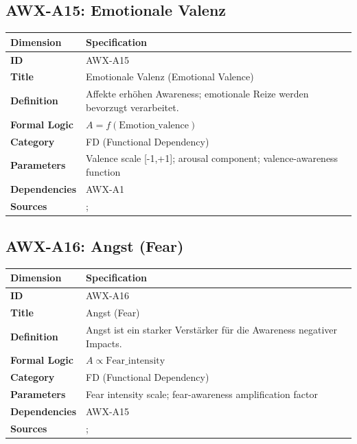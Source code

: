 
\subsection{AWX-A15: Emotionale Valenz}

\begin{table}[htbp]
\small
\begin{tabular}{p{3cm}p{11cm}}
\toprule
\textbf{Dimension} & \textbf{Specification} \\
\midrule
\textbf{ID} & AWX-A15 \\
\textbf{Title} & Emotionale Valenz (Emotional Valence) \\
\textbf{Definition} & Affekte erhöhen Awareness; emotionale Reize werden bevorzugt verarbeitet. \\
\textbf{Formal Logic} & $A = f(\text{Emotion\_valence})$ \\
\textbf{Category} & FD (Functional Dependency) \\
\textbf{Parameters} & Valence scale [-1,+1]; arousal component; valence-awareness function \\
\textbf{Dependencies} & AWX-A1 \\
\textbf{Sources} & \citet{loewenstein2001risk}; \citet{slovic2004risk} \\
\bottomrule
\end{tabular}
\end{table}


\subsection{AWX-A16: Angst (Fear)}

\begin{table}[htbp]
\small
\begin{tabular}{p{3cm}p{11cm}}
\toprule
\textbf{Dimension} & \textbf{Specification} \\
\midrule
\textbf{ID} & AWX-A16 \\
\textbf{Title} & Angst (Fear) \\
\textbf{Definition} & Angst ist ein starker Verstärker für die Awareness negativer Impacts. \\
\textbf{Formal Logic} & $A \propto \text{Fear\_intensity}$ \\
\textbf{Category} & FD (Functional Dependency) \\
\textbf{Parameters} & Fear intensity scale; fear-awareness amplification factor \\
\textbf{Dependencies} & AWX-A15 \\
\textbf{Sources} & \citet{loewenstein2001risk}; \citet{slovic2004risk} \\
\bottomrule
\end{tabular}
\end{table}

